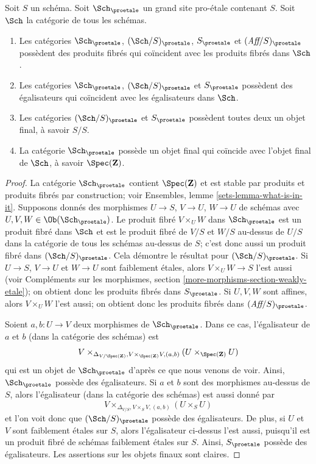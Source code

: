 \begin{lemma}
\label{lemma-fibre-products-proetale}
Soit $S$ un schéma. Soit $\Sch_\proetale$ un grand site pro-\'etale
contenant $S$. Soit $\Sch$ la catégorie de tous les schémas.
\begin{enumerate}
\item Les catégories $\Sch_\proetale$, $(\Sch/S)_\proetale$,
$S_\proetale$ et $(\textit{Aff}/S)_\proetale$ possèdent des produits fibrés
qui coïncident avec les produits fibrés dans $\Sch$.
\item Les catégories $\Sch_\proetale$, $(\Sch/S)_\proetale$ et
$S_\proetale$ possèdent des égalisateurs qui coïncident avec les égalisateurs dans $\Sch$.
\item Les catégories $(\Sch/S)_\proetale$ et $S_\proetale$ possèdent toutes deux
un objet final, à savoir $S/S$.
\item La catégorie $\Sch_\proetale$ possède un objet final qui coïncide
avec l'objet final de $\Sch$, à savoir $\Spec(\mathbf{Z})$.
\end{enumerate}
\end{lemma}

\begin{proof}
La catégorie $\Sch_\proetale$ contient $\Spec(\mathbf{Z})$ et
est stable par produits et produits fibrés par construction; voir
Ensembles, lemme \ref{sets-lemma-what-is-in-it}.
Supposons donnés des morphismes $U \to S$, $V \to U$, $W \to U$
de schémas avec $U, V, W \in \Ob(\Sch_\proetale)$.
Le produit fibré $V \times_U W$ dans $\Sch_\proetale$
est un produit fibré dans $\Sch$ et
est le produit fibré de $V/S$ et $W/S$ au-dessus de $U/S$ dans
la catégorie de tous les schémas au-dessus de $S$; c'est donc aussi un
produit fibré dans $(\Sch/S)_\proetale$.
Cela démontre le résultat pour $(\Sch/S)_\proetale$.
Si $U \to S$, $V \to U$ et $W \to U$ sont faiblement \'etales, alors
$V \times_U W \to S$ l'est aussi (voir
Compléments sur les morphismes, section \ref{more-morphisms-section-weakly-etale});
on obtient donc les produits fibrés dans $S_\proetale$.
Si $U, V, W$ sont affines, alors $V \times_U W$ l'est aussi; on obtient donc
les produits fibrés dans $(\textit{Aff}/S)_\proetale$.

\medskip\noindent
Soient $a, b : U \to V$ deux morphismes de $\Sch_\proetale$.
Dans ce cas, l'égalisateur de $a$ et $b$ (dans la catégorie des schémas) est
$$
V
\times_{\Delta_{V/\Spec(\mathbf{Z})}, V \times_{\Spec(\mathbf{Z})} V, (a, b)}
(U \times_{\Spec(\mathbf{Z})} U)
$$
qui est un objet de $\Sch_\proetale$ d'après ce que nous venons de voir.
Ainsi, $\Sch_\proetale$ possède des égalisateurs. Si $a$ et $b$ sont des morphismes au-dessus de $S$,
alors l'égalisateur (dans la catégorie des schémas) est aussi donné par
$$
V \times_{\Delta_{V/S}, V \times_S V, (a, b)} (U \times_S U)
$$
et l'on voit donc que $(\Sch/S)_\proetale$ possède des égalisateurs. De plus, si
$U$ et $V$ sont faiblement \'etales sur $S$, alors l'égalisateur ci-dessus
l'est aussi, puisqu'il est un produit fibré de schémas faiblement \'etales sur $S$.
Ainsi, $S_\proetale$ possède des égalisateurs. Les assertions sur les objets finaux
sont claires.
\end{proof}

